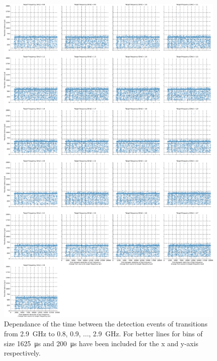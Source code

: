 \begin{figure}[]
    \centering
    \includegraphics[width=\columnwidth]{fig/ftalat_scatter_wait_transition_latency_hati_source_2.9.pdf}
    \caption{Dependance of the time between the detection events of transitions from \SI{2.9}{\GHz} to \SI{0.8}{}, \SI{0.9}{}, ..., \SI{2.9}{\GHz}. For better lines for bins of size \SI{1625}{\us} and \SI{200}{\us} have been included for the x and y-axis respectively.}
\end{figure}